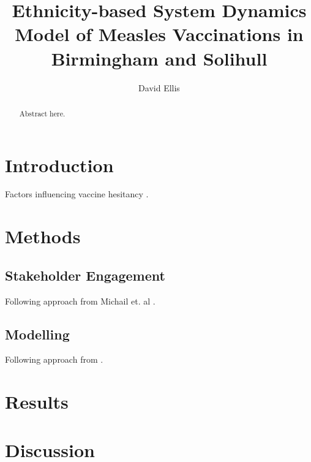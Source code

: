 \documentclass{article}
\title{Ethnicity-based System Dynamics Model of Measles Vaccinations in Birmingham and Solihull}
\author{David Ellis}
\date{}
\begin{document}
\maketitle

\begin{abstract}
    Abstract here.
\end{abstract}

\section{Introduction}

Factors influencing vaccine hesitancy \cite{Williams02092014}.

\section{Methods}
\subsection{Stakeholder Engagement}
Following approach from Michail et. al \cite{michail2025evaluation}.

\subsection{Modelling}
Following approach from \cite{van2020explaining} \textbf{}.

\section{Results}

\section{Discussion}




\end{document}
